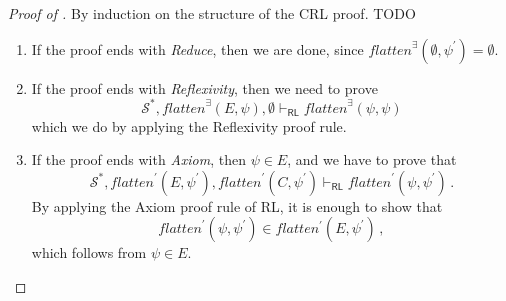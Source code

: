 \documentclass{article}
\newcommand{\RL}{\mathsf{RL}}
\begin{document}
\begin{proof}[Proof of ]
By induction on the structure of the CRL proof. TODO
\begin{enumerate}
    \item If the proof ends with \emph{Reduce}, then we are done, since $\mathit{flatten}^\exists(\emptyset, \psi^\prime) = \emptyset$.
    
    \item If the proof ends with \emph{Reflexivity}, then we need to prove
    \begin{equation*}
        \mathcal{S}^*, \mathit{flatten}^\exists(E, \psi), \emptyset \vdash_\RL
          \mathit{flatten}^\exists(\psi, \psi) 
    \end{equation*}
    which we do by applying the Reflexivity proof rule.
    
    \item If the proof ends with \emph{Axiom}, then $\psi \in E$,
          and we have to prove that
          \begin{equation*}
            \mathcal{S}^*, \mathit{flatten}^\prime(E, \psi^\prime), \mathit{flatten}^\prime(C, \psi^\prime) \vdash_\RL
            \mathit{flatten}^\prime(\psi, \psi^\prime)               \, .
          \end{equation*}
          By applying the Axiom proof rule of RL, it is enough to show that
          \begin{equation*}
              \mathit{flatten}^\prime(\psi, \psi^\prime) \in \mathit{flatten^\prime}(E, \psi^\prime) \, ,
          \end{equation*}
          which follows from $\psi \in E$.
          

\end{enumerate}
\end{proof}
\end{document}
